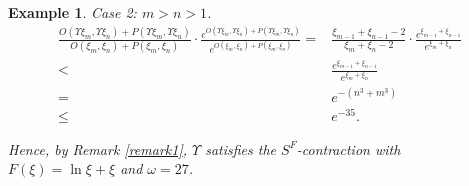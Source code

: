 \documentclass[pdflatex,sn-mathphys-num]{sn-jnl}%
\theoremstyle{thmstyleone}%
\theoremstyle{thmstyletwo}%
\newtheorem{example}{Example}%
\theoremstyle{thmstylethree}%
\begin{document}
\begin{example}
\medskip

\noindent
\emph{Case 2: $m>n>1$.}
\begin{align*}
    \frac{O(\Upsilon \xi_m,\Upsilon \xi _n)+P(\Upsilon \xi_m,\Upsilon \xi _n)}{O(\xi_m,\xi_n)+P(\xi_m,\xi_n)}
\cdot\frac{e^{O(\Upsilon \xi_m,\Upsilon \xi _n)+P(\Upsilon \xi_m,\Upsilon \xi _n)}}{e^{O(\xi_m,\xi_n)+P(\xi_m,\xi_n)}}
=& \frac{\xi_{m-1}+\xi_{n-1}-2}{\xi_m+\xi_{n}-2}\cdot\frac{e^{\xi_{m-1}+\xi_{n-1}}}{e^{\xi_m+\xi_{n}}}\\
<& \frac{e^{\xi_{m-1}+\xi_{n-1}}}{e^{\xi_m+\xi_{n}}}\\
=& e^{-(n^3+m^3)}\\
\le& e^{-35}.
\end{align*}

Hence, by Remark \ref{remark1}, $\Upsilon $ satisfies the $S^{F}$-contraction with $F(\xi)=\ln \xi +\xi$ 
 and $\omega  =27$.
\end{example}
\end{document}
